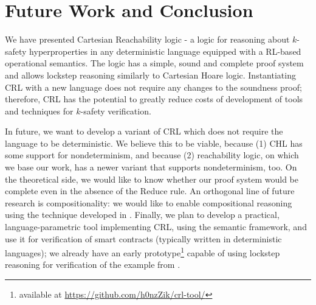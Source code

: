 \section{Future Work and Conclusion}

We have presented Cartesian Reachability logic - a logic for reasoning about $k$-safety hyperproperties
in any deterministic language equipped with a RL-based operational semantics.
The logic has a simple, sound and complete proof system and allows lockstep reasoning
similarly to Cartesian Hoare logic.
Instantiating CRL with a new language does not require any changes to the soundness proof;
therefore, CRL has the potential to greatly reduce costs of development of tools and techniques for $k$-safety verification.

In future, we want to develop a variant of CRL which does not require the language to be deterministic.
We believe this to be viable, because (1) CHL has some support for nondeterminism,
and because (2) reachability logic, on which we base our work, has a newer variant that supports nondeterminism, too.
On the theoretical side, we would like to know whether our proof system would be complete even in the absence of
the Reduce rule.
An orthogonal line of future research is compositionality: we would like to enable compositional reasoning
using the technique developed in \cite{DOsualdoFD22}.
Finally, we plan to develop a practical, language-parametric tool implementing CRL,
using the \K{} semantic framework, and use it for verification of smart contracts
(typically written in deterministic languages);
we already have an early prototype\footnote{available at \url{https://github.com/h0nzZik/crl-tool/}}
capable of using lockstep reasoning for verification of the example from .
